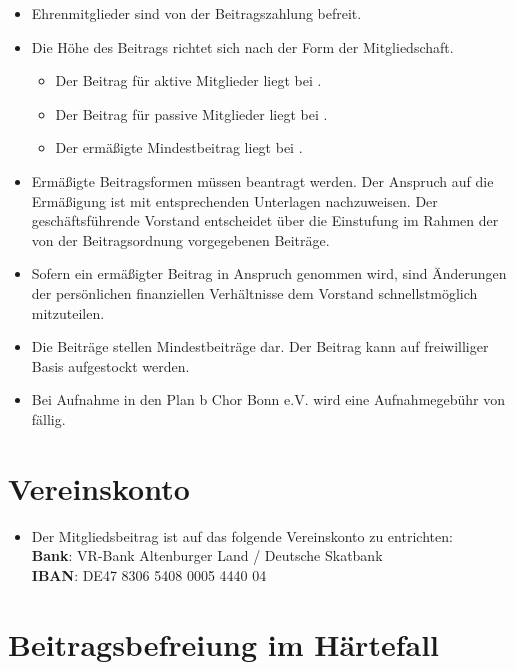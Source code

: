 \documentclass[12pt,paper=a4,ngerman]{report}
\begin{document}
\begin{itemize}
    \item Ehrenmitglieder sind von der Beitragszahlung befreit.
    \item Die Höhe des Beitrags richtet sich nach der Form der Mitgliedschaft.
    \begin{itemize}
        \item Der Beitrag für aktive Mitglieder liegt bei .
        \item Der Beitrag für passive Mitglieder liegt bei .
        \item Der ermäßigte Mindestbeitrag liegt bei .
    \end{itemize}

    \item Ermäßigte Beitragsformen müssen beantragt werden. Der Anspruch auf die Ermäßigung ist mit entsprechenden Unterlagen nachzuweisen. Der geschäftsführende Vorstand entscheidet über die Einstufung im Rahmen der von der Beitragsordnung vorgegebenen Beiträge.

    \item Sofern ein ermäßigter Beitrag in Anspruch genommen wird, sind Änderungen der persönlichen finanziellen Verhältnisse dem Vorstand schnellstmöglich mitzuteilen.

    \item Die Beiträge stellen Mindestbeiträge dar. Der Beitrag kann auf freiwilliger Basis aufgestockt werden.

    \item Bei Aufnahme in den Plan b Chor Bonn e.V. wird eine Aufnahmegebühr von  fällig.
\end{itemize}

\section{Vereinskonto}

\begin{itemize}
    \item Der Mitgliedsbeitrag ist auf das folgende Vereinskonto zu entrichten:\vspace{1em}\\
    \textbf{Bank}: VR-Bank Altenburger Land / Deutsche Skatbank\\
    \textbf{IBAN}: DE47 8306 5408 0005 4440 04
\end{itemize}

\section{Beitragsbefreiung im Härtefall}
\end{document}
